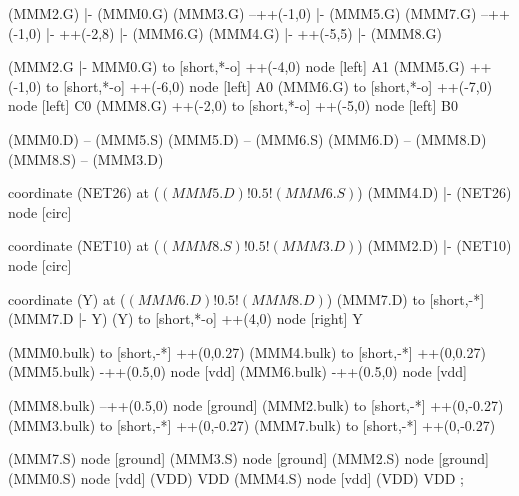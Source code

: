 \begin{circuitikz}[american]
	(MMM2.G) |- (MMM0.G)
	(MMM3.G) --++(-1,0) |- (MMM5.G)
	(MMM7.G) --++(-1,0) |- ++(-2,8) |- (MMM6.G)
	(MMM4.G) |- ++(-5,5) |- (MMM8.G)
	
	(MMM2.G |- MMM0.G) to [short,*-o] ++(-4,0) node [left] {A1}
	(MMM5.G) ++(-1,0) to [short,*-o] ++(-6,0) node [left] {A0}
	(MMM6.G) to [short,*-o] ++(-7,0) node [left] {C0}
	(MMM8.G) ++(-2,0) to [short,*-o] ++(-5,0) node [left] {B0}
	
	(MMM0.D) -- (MMM5.S)
	(MMM5.D) -- (MMM6.S)
	(MMM6.D) -- (MMM8.D)
	(MMM8.S) -- (MMM3.D)
	
	coordinate (NET26) at ($(MMM5.D)!0.5!(MMM6.S)$)
	(MMM4.D) |- (NET26) node [circ] {}
	
	coordinate (NET10) at ($(MMM8.S)!0.5!(MMM3.D)$)
	(MMM2.D) |- (NET10) node [circ] {}
	
	coordinate (Y) at ($(MMM6.D)!0.5!(MMM8.D)$)
	(MMM7.D) to [short,-*] (MMM7.D |- Y)
	(Y) to [short,*-o] ++(4,0) node [right] {Y}
	
	(MMM0.bulk) to [short,-*] ++(0,0.27)
	(MMM4.bulk) to [short,-*] ++(0,0.27)
	(MMM5.bulk) -++(0.5,0) node [vdd]{}
	(MMM6.bulk) -++(0.5,0) node [vdd]{}
	
	(MMM8.bulk) --++(0.5,0) node [ground]{}	
	(MMM2.bulk) to [short,-*] ++(0,-0.27)
	(MMM3.bulk) to [short,-*] ++(0,-0.27)
	(MMM7.bulk) to [short,-*] ++(0,-0.27)


	(MMM7.S) node [ground] {}
	(MMM3.S) node [ground] {}
	(MMM2.S) node [ground] {}
	(MMM0.S) node [vdd] (VDD) {VDD}
	(MMM4.S) node [vdd] (VDD) {VDD}
;

\end{circuitikz}
